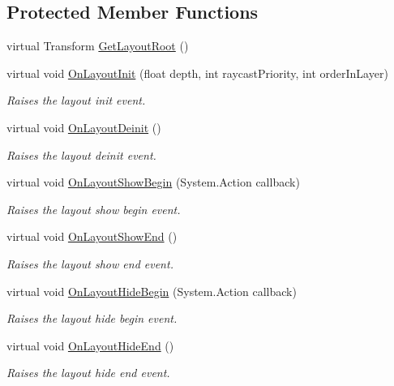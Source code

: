 \subsection*{Protected Member Functions}
\begin{DoxyCompactItemize}
\item 
virtual Transform \hyperlink{class_unity_engine_1_1_u_i_1_1_windows_1_1_window_base_a85c7fb357a0ad3269bc4ec10e75c34b1}{Get\+Layout\+Root} ()
\item 
virtual void \hyperlink{class_unity_engine_1_1_u_i_1_1_windows_1_1_window_base_a8462e586646fe4ef6840b43e4b66e1e7}{On\+Layout\+Init} (float depth, int raycast\+Priority, int order\+In\+Layer)
\begin{DoxyCompactList}\small\item\em Raises the layout init event. \end{DoxyCompactList}\item 
virtual void \hyperlink{class_unity_engine_1_1_u_i_1_1_windows_1_1_window_base_a63633433dc341ba795cb2cdb5121b287}{On\+Layout\+Deinit} ()
\begin{DoxyCompactList}\small\item\em Raises the layout deinit event. \end{DoxyCompactList}\item 
virtual void \hyperlink{class_unity_engine_1_1_u_i_1_1_windows_1_1_window_base_a76681fb77d5c3908a907a8f07747cefe}{On\+Layout\+Show\+Begin} (System.\+Action callback)
\begin{DoxyCompactList}\small\item\em Raises the layout show begin event. \end{DoxyCompactList}\item 
virtual void \hyperlink{class_unity_engine_1_1_u_i_1_1_windows_1_1_window_base_ad2b2d98d6f7bd72cf1a70973861df195}{On\+Layout\+Show\+End} ()
\begin{DoxyCompactList}\small\item\em Raises the layout show end event. \end{DoxyCompactList}\item 
virtual void \hyperlink{class_unity_engine_1_1_u_i_1_1_windows_1_1_window_base_aa4e23dbf20e969b8ec3437dfc94346ff}{On\+Layout\+Hide\+Begin} (System.\+Action callback)
\begin{DoxyCompactList}\small\item\em Raises the layout hide begin event. \end{DoxyCompactList}\item 
virtual void \hyperlink{class_unity_engine_1_1_u_i_1_1_windows_1_1_window_base_ad35319b94cabc46485bbadedabcf0473}{On\+Layout\+Hide\+End} ()
\begin{DoxyCompactList}\small\item\em Raises the layout hide end event. \end{DoxyCompactList}\end{DoxyCompactItemize}


